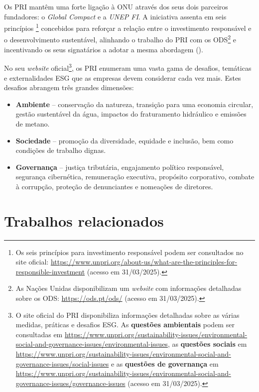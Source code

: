 Os PRI mantêm uma forte ligação à \gls{ONU} através dos seus dois parceiros fundadores: o \textit{Global Compact} e a \textit{\gls{UNEP FI}}. A iniciativa assenta em seis princípios \footnote{Os seis princípios para investimento responsável podem ser consultados no site oficial: \url{https://www.unpri.org/about-us/what-are-the-principles-for-responsible-investment} (acesso em 31/03/2025).} concebidos para reforçar a relação entre o investimento responsável e o desenvolvimento sustentável, alinhando o trabalho do PRI com os \gls{ODS}\footnote{As Nações Unidas disponibilizam um \textit{website} com informações detalhadas sobre os \gls{ODS}: \url{https://ods.pt/ods/} (acesso em 31/03/2025).} e incentivando os seus signatários a adotar a mesma abordagem (\cite{PRIBlueprint2017}).

No seu \textit{website} oficial\footnote{O site oficial do PRI disponibiliza informações detalhadas sobre as várias medidas, práticas e desafios \gls{ESG}. As \textbf{questões ambientais} podem ser consultadas em \url{https://www.unpri.org/sustainability-issues/environmental-social-and-governance-issues/environmental-issues}, as \textbf{questões sociais} em \url{https://www.unpri.org/sustainability-issues/environmental-social-and-governance-issues/social-issues} e as \textbf{questões de governança} em \url{https://www.unpri.org/sustainability-issues/environmental-social-and-governance-issues/governance-issues} (acesso em 31/03/2025).}, os \gls{PRI} enumeram uma vasta gama de desafios, temáticas e externalidades \gls{ESG} que as empresas devem considerar cada vez mais. Estes desafios abrangem três grandes dimensões:

\begin{itemize}
\item \textbf{Ambiente} – conservação da natureza, transição para uma economia circular, gestão sustentável da água, impactos do fraturamento hidráulico e emissões de metano.
\item \textbf{Sociedade} – promoção da diversidade, equidade e inclusão, bem como condições de trabalho dignas.
\item \textbf{Governança} – justiça tributária, engajamento político responsável, segurança cibernética, remuneração executiva, propósito corporativo, combate à corrupção, proteção de denunciantes e nomeações de diretores.
\end{itemize}


\section{Trabalhos relacionados} 
\label{sec:TR} 

